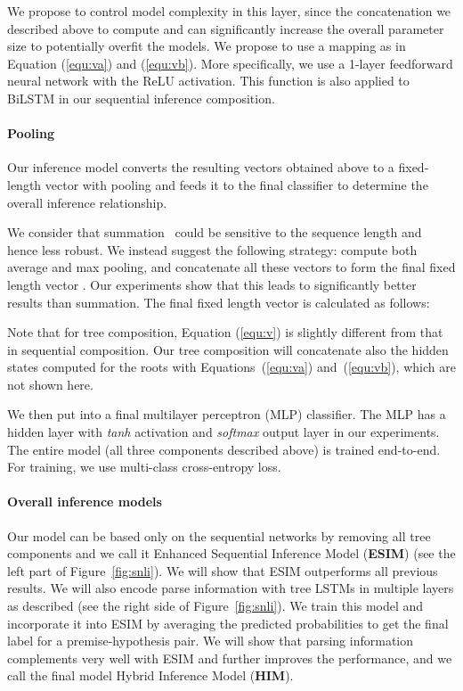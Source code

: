 \documentclass[11pt,a4paper]{article}
\begin{document}
{\fontsize{10pt}{1.0cm}
	
}

\noindent We propose to control model complexity in this layer, since the concatenation we described above to compute  and  can significantly increase the overall parameter size to potentially overfit the models. We propose to use a mapping  as in Equation (\ref{equ:va}) and (\ref{equ:vb}). More specifically, we use a 1-layer feedforward neural network with the ReLU activation. This function is also applied to BiLSTM in our sequential inference composition. 

\paragraph{Pooling}
Our inference model converts the resulting vectors obtained above to a fixed-length vector with pooling and feeds it to the final classifier to determine the overall inference relationship. 

We consider that summation~\citep{Parikh:D16-1244} could be sensitive to the sequence length and hence less robust. We instead suggest the following strategy: compute both average and max pooling, and concatenate all these vectors to form the final fixed length vector . Our experiments show that this leads to significantly better results than summation. The final fixed length vector  is calculated as follows:
{\fontsize{10pt}{1.0cm}
	
    \vspace{-2mm}
	
}

Note that for tree composition, Equation (\ref{equ:v}) is slightly different from that in sequential composition. Our tree composition will concatenate also the hidden states computed for the roots with Equations~(\ref{equ:va}) and~(\ref{equ:vb}), which are not shown here. 

We then put  into a final multilayer perceptron (MLP) classifier. The MLP has a hidden layer with \textit{tanh} activation and \textit{softmax} output layer in our experiments. The entire model (all three components described above) is trained end-to-end. For training, we use multi-class cross-entropy loss. 

\paragraph{Overall inference models}

Our model can be based only on the sequential networks by removing all tree components and we call it Enhanced Sequential Inference Model (\textbf{ESIM}) (see the left part of Figure~\ref{fig:snli}). We will show that ESIM outperforms all previous results. We will also encode parse information with tree LSTMs in multiple layers as described (see the right side of Figure~\ref{fig:snli}). We train this model and incorporate it into ESIM by averaging the predicted probabilities to get the final label for a premise-hypothesis pair. We will show that parsing information complements very well with ESIM and further improves the performance, and we call the final model Hybrid Inference Model (\textbf{HIM}).
\end{document}
